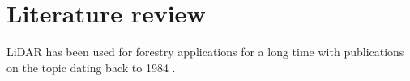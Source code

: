 \chapter{Literature review}\label{cap:background}

LiDAR has been used for forestry applications for a long time with publications on the topic dating back to 1984 \cite{nelsonDeterminingForestCanopy1984, nilssonEstimationTreeHeights1996, naessetDeterminationMeanTree1997, naessetEstimatingTimberVolume1997, carson2004lidar}.